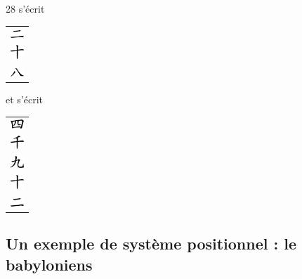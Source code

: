 \smallskip

\begin{exemple*1}
   {\renewcommand{\arraystretch}{0.5}
   28 s'écrit \begin{tabular}{c}
      \includegraphics[width=5mm]{Nombres_et_calculs/Images/N1_chinois2} \\
      \includegraphics[width=5mm]{Nombres_et_calculs/Images/N1_chinois10} \\
      \includegraphics[width=5mm]{Nombres_et_calculs/Images/N1_chinois8} \\
   \end{tabular} et  s'écrit
   \begin{tabular}{c}
      \includegraphics[width=5mm]{Nombres_et_calculs/Images/N1_chinois4} \\
      \includegraphics[width=5mm]{Nombres_et_calculs/Images/N1_chinois1000} \\
      \includegraphics[width=5mm]{Nombres_et_calculs/Images/N1_chinois9} \\
      \includegraphics[width=5mm]{Nombres_et_calculs/Images/N1_chinois10} \\
      \includegraphics[width=5mm]{Nombres_et_calculs/Images/N1_chinois2} \\
   \end{tabular}}
\end{exemple*1}


\subsection{Un exemple de système positionnel : le babyloniens} %

